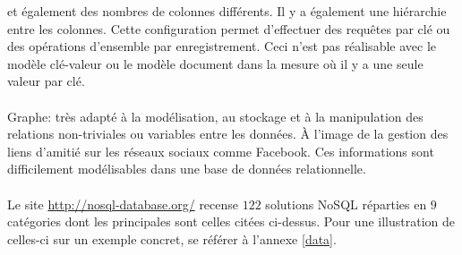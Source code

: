 et également des nombres de colonnes différents. Il y a également une
hiérarchie entre les colonnes. Cette configuration permet d’effectuer
des requêtes par clé ou des opérations d'ensemble par enregistrement.
Ceci n'est
pas réalisable avec le modèle \textsf{clé-valeur} ou le
modèle \textsf{document} dans la mesure où il y a une seule valeur par
clé.
\\
\\
{\sf Graphe}: très adapté à la
modélisation, au stockage et à la manipulation des relations
non-triviales ou variables entre les données. À l'image de la gestion
des liens d'amitié sur les réseaux sociaux comme \textsf{Facebook}. 
Ces informations sont difficilement
modélisables dans une base de données relationnelle.
\\
\\ 
Le site \url{http://nosql-database.org/} recense $122$
solutions \textsf{NoSQL} réparties en $9$ catégories dont les
principales sont celles citées ci-dessus. Pour une
illustration de celles-ci sur un exemple concret, se référer à l'annexe \ref{data}.
